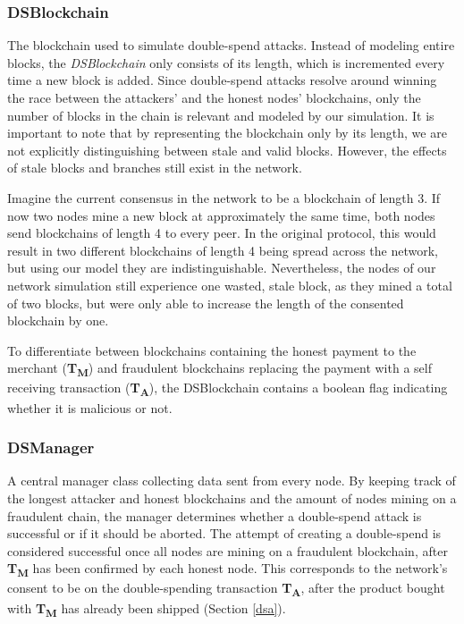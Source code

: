 \documentclass[a4paper,12pt,twoside]{report}
\begin{document}
\subsubsection{DSBlockchain}
The blockchain used to simulate double-spend attacks. Instead of modeling entire blocks, the \textit{DSBlockchain} only consists of its length, which is incremented every time a new block is added. Since double-spend attacks resolve around winning the race between the attackers' and the honest nodes' blockchains, only the number of blocks in the chain is relevant and modeled by our simulation. It is important to note that by representing the blockchain only by its length, we are not explicitly distinguishing between stale and valid blocks. However, the effects of stale blocks and branches still exist in the network. 

Imagine the current consensus in the network to be a blockchain of length 3. If now two nodes mine a new block at approximately the same time, both nodes send blockchains of length 4 to every peer. In the original protocol, this would result in two different blockchains of length 4 being spread across the network, but using our model they are indistinguishable. Nevertheless, the nodes of our network simulation still experience one wasted, stale block, as they mined a total of two blocks, but were only able to increase the length of the consented blockchain by one.

To differentiate between blockchains containing the honest payment to the merchant (\textbf{T\textsubscript{M}}) and fraudulent blockchains replacing the payment with a self receiving transaction (\textbf{T\textsubscript{A}}), the DSBlockchain contains a boolean flag indicating whether it is malicious or not.
\subsubsection{DSManager} \label{manager}
A central manager class collecting data sent from every node. By keeping track of the longest attacker and honest blockchains and the amount of nodes mining on a fraudulent chain, the manager determines whether a double-spend attack is successful or if it should be aborted. The attempt of creating a double-spend is considered successful once all nodes are mining on a fraudulent blockchain, after \textbf{T\textsubscript{M}} has been confirmed by each honest node. This corresponds to the network's consent to be on the double-spending transaction \textbf{T\textsubscript{A}}, after the product bought with \textbf{T\textsubscript{M}} has already been shipped (Section \ref{dsa}). 
\end{document}
